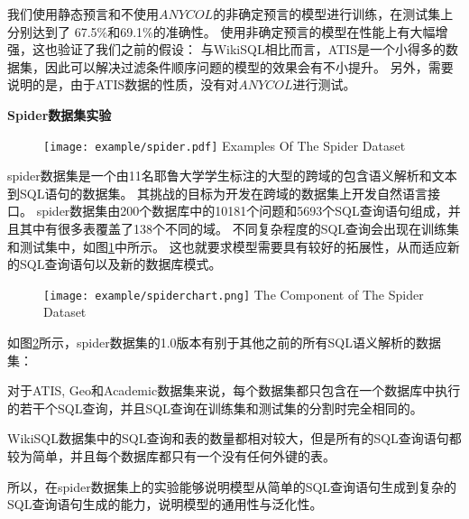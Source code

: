 我们使用静态预言和不使用$ANYCOL$的非确定预言的模型进行训练，在测试集上分别达到了 67.5\%和69.1\%的准确性。
使用非确定预言的模型在性能上有大幅增强，这也验证了我们之前的假设：
与WikiSQL相比而言，ATIS是一个小得多的数据集，因此可以解决过滤条件顺序问题的模型的效果会有不小提升。
另外，需要说明的是，由于ATIS数据的性质，没有对$ANYCOL$进行测试。

\textbf{Spider数据集实验}

\begin{figure}[!htp]
  \centering
  \texttt{[image: example/spider.pdf]}
    {Examples Of The Spider Dataset}
  \label{fig:spiderxample}
\end{figure}

spider数据集是一个由11名耶鲁大学学生标注的大型的跨域的包含语义解析和文本到SQL语句的数据集。
其挑战的目标为开发在跨域的数据集上开发自然语言接口。
spider数据集由200个数据库中的10181个问题和5693个SQL查询语句组成，并且其中有很多表覆盖了138个不同的域。
不同复杂程度的SQL查询会出现在训练集和测试集中，如图\ref{fig:spiderxample}中所示。
这也就要求模型需要具有较好的拓展性，从而适应新的SQL查询语句以及新的数据库模式。

\begin{figure}[!htp]
  \centering
  \texttt{[image: example/spiderchart.png]}
    {The Component of The Spider Dataset}
  \label{fig:spiderchart}
\end{figure}

如图\ref{fig:spiderchart}所示，spider数据集的1.0版本有别于其他之前的所有SQL语义解析的数据集：

\begin{itemize*}
  \item 对于ATIS, Geo和Academic数据集来说，每个数据集都只包含在一个数据库中执行的若干个SQL查询，并且SQL查询在训练集和测试集的分割时完全相同的。
  
  \item WikiSQL数据集中的SQL查询和表的数量都相对较大，但是所有的SQL查询语句都较为简单，并且每个数据库都只有一个没有任何外键的表。  
\end{itemize*}

所以，在spider数据集上的实验能够说明模型从简单的SQL查询语句生成到复杂的SQL查询语句生成的能力，说明模型的通用性与泛化性。

